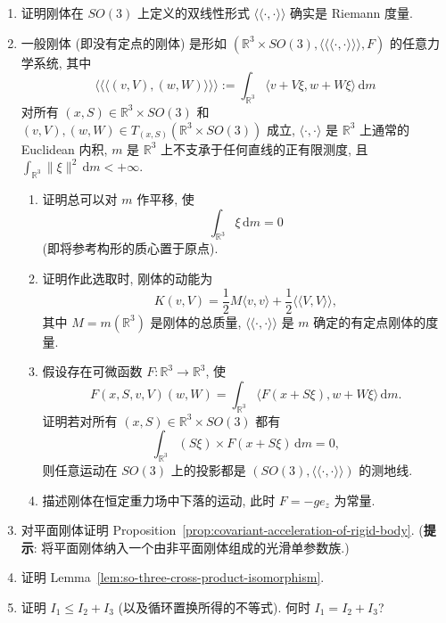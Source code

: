 \begin{RiemannExercise}\label{ex:rigid-body}
\begin{enumerate}[label=(\arabic*),ref=\arabic*,leftmargin=*]
\item\label{ex:rigid-body-metric-is-riemannian} 证明刚体在 $SO(3)$ 上定义的双线性形式 $\langle\!\langle\cdot,\cdot\rangle\!\rangle$ 确实是 Riemann 度量.
\item\label{ex:rigid-body-without-fixed-point} 一般刚体 (即没有定点的刚体) 是形如 $(\mathbb{R}^3\times SO(3),\langle\!\langle\!\langle\cdot,\cdot\rangle\!\rangle\!\rangle,F)$ 的任意力学系统, 其中
\[
  \langle\!\langle\!\langle(v,V),(w,W)\rangle\!\rangle\!\rangle
  :=\int_{\mathbb{R}^3}\langle v+V\xi,w+W\xi\rangle\,\mathrm{d}m
\]
对所有 $(x,S)\in\mathbb{R}^3\times SO(3)$ 和 $(v,V),(w,W)\in T_{(x,S)}(\mathbb{R}^3\times SO(3))$ 成立, $\langle\cdot,\cdot\rangle$ 是 $\mathbb{R}^3$ 上通常的 Euclidean 内积, $m$ 是 $\mathbb{R}^3$ 上不支承于任何直线的正有限测度, 且 $\int_{\mathbb{R}^3}\|\xi\|^2\,\mathrm{d}m<+\infty$.
\begin{enumerate}[label=(\alph*),leftmargin=*]
\item 证明总可以对 $m$ 作平移, 使
\[
  \int_{\mathbb{R}^3}\xi\,\mathrm{d}m=0
\]
(即将参考构形的质心置于原点).
\item 证明作此选取时, 刚体的动能为
\[
  K(v,V)=\frac{1}{2}M\langle v,v\rangle+\frac{1}{2}\langle\!\langle V,V\rangle\!\rangle,
\]
其中 $M=m(\mathbb{R}^3)$ 是刚体的总质量, $\langle\!\langle\cdot,\cdot\rangle\!\rangle$ 是 $m$ 确定的有定点刚体的度量.
\item 假设存在可微函数 $F:\mathbb{R}^3\to\mathbb{R}^3$, 使
\[
  F(x,S,v,V)(w,W)=\int_{\mathbb{R}^3}\langle F(x+S\xi),w+W\xi\rangle\,\mathrm{d}m.
\]
证明若对所有 $(x,S)\in\mathbb{R}^3\times SO(3)$ 都有
\[
  \int_{\mathbb{R}^3}(S\xi)\times F(x+S\xi)\,\mathrm{d}m=0,
\]
则任意运动在 $SO(3)$ 上的投影都是 $(SO(3),\langle\!\langle\cdot,\cdot\rangle\!\rangle)$ 的测地线.
\item 描述刚体在恒定重力场中下落的运动, 此时 $F=-ge_z$ 为常量.
\end{enumerate}
\item\label{ex:acceleration-formula-for-planar-rigid-body} 对平面刚体证明 Proposition~\ref{prop:covariant-acceleration-of-rigid-body}. (\textbf{提示}: 将平面刚体纳入一个由非平面刚体组成的光滑单参数族.)
\item\label{ex:prove-so-three-cross-product-isomorphism} 证明 Lemma~\ref{lem:so-three-cross-product-isomorphism}.
\item\label{ex:principal-moment-triangle-inequality} 证明 $I_1\leq I_2+I_3$ (以及循环置换所得的不等式). 何时 $I_1=I_2+I_3$?

\end{enumerate}
\end{RiemannExercise}

